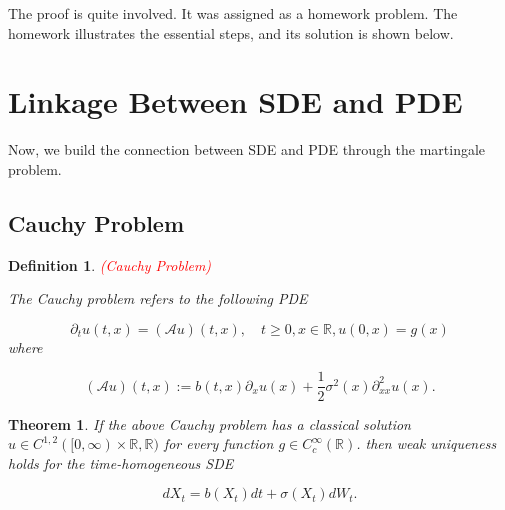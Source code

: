 \documentclass{article}
\newtheorem{definition}{Definition}
\newtheorem{theorem}{Theorem}
\begin{document}
The proof is quite involved. It was assigned as a homework problem. The homework illustrates the essential steps, and its solution is shown below. 




\section{Linkage Between SDE and PDE}
Now, we build the connection between SDE and PDE through the martingale problem.

\subsection{Cauchy Problem}

\begin{definition} \textcolor{red}{(Cauchy Problem)}

The Cauchy problem refers to the following PDE

\begin{equation*}
\partial_tu(t,x)=(\mathcal{A}u)(t,x), \quad t\geq0, x\in\mathbb{R},u(0,x)=g(x)
\end{equation*}
where

\begin{equation*} 
(\mathcal{A}u)(t,x):=b(t,x)\partial_xu(x)+\frac{1}{2}\sigma^2(x)\partial^2_{xx}u(x).
\end{equation*}

\end{definition}

\begin{theorem}
If the above Cauchy problem has a classical solution $u\in C^{1,2}([0,\infty)\times\mathbb{R},\mathbb{R})$ for every function $g\in C_c^\infty(\mathbb{R})$. then weak uniqueness holds for the time-homogeneous SDE

\begin{equation} \label{time_homo_sde}
dX_t=b(X_t)dt + \sigma(X_t)dW_t.
\end{equation}

\end{theorem}
\end{document}
